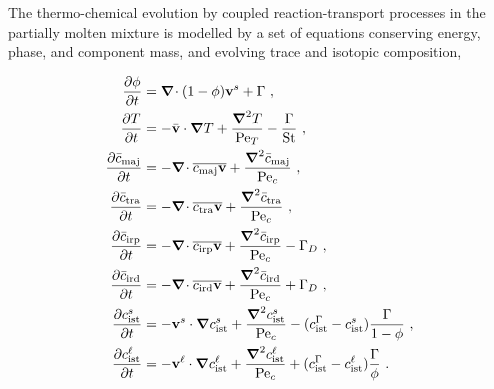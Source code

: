 \documentclass[12pt,a4paper]{article}
\begin{document}
The thermo-chemical evolution by coupled reaction-transport processes in the partially molten mixture is modelled by a set of equations conserving energy, phase, and component mass, and evolving trace and isotopic composition,
\begin{linenomath*}
\begin{subequations}
\label{eq:nondim-coeffs}
\begin{align}
	\label{eq:nondim-phase}
	\dfrac{\partial \phi}{\partial t}  &= \mbox{\boldmath $\nabla$}\!\cdot (1-\phi) \mathbf{v}^s +  \Gamma \ , \\
	\label{eq:nondim-energy}
	\dfrac{\partial T}{\partial t} &= - \bar{\mathbf{v}} \cdot \mbox{\boldmath $\nabla$} T + \dfrac{ \boldsymbol{\nabla}^2 T }{\mathrm{Pe}_T} - \dfrac{\Gamma}{\mathrm{St}} \ , \\
	\label{eq:nondim-major}
	\dfrac{\partial \bar{c}_\mathrm{maj}}{\partial t} &= - \mbox{\boldmath $\nabla$}\!\cdot \overline{c_\mathrm{maj} \mathbf{v}} + \dfrac{ \boldsymbol{\nabla}^2 \bar{c}_\mathrm{maj} }{\mathrm{Pe}_c}  \ , \\
	\label{eq:nondim-trace}
	\dfrac{\partial \bar{c}_\mathrm{tra}}{\partial t} &= - \mbox{\boldmath $\nabla$}\!\cdot  \overline{c_\mathrm{tra} \mathbf{v}} + \dfrac{ \boldsymbol{\nabla}^2 \bar{c}_\mathrm{tra} }{\mathrm{Pe}_c}  \ , \\
	\label{eq:nondim-radiogen-parent}
	\dfrac{\partial \bar{c}_\mathrm{irp}}{\partial t} &= - \mbox{\boldmath $\nabla$}\!\cdot  \overline{c_\mathrm{irp} \mathbf{v}} + \dfrac{ \boldsymbol{\nabla}^2 \bar{c}_\mathrm{irp} }{\mathrm{Pe}_c}  - \Gamma_D  \ , \\
	\label{eq:nondim-radiogen-daughter}
	\dfrac{\partial \bar{c}_\mathrm{ird}}{\partial t} &= - \mbox{\boldmath $\nabla$}\!\cdot  \overline{c_\mathrm{ird} \mathbf{v}} + \dfrac{ \boldsymbol{\nabla}^2 \bar{c}_\mathrm{ird} }{\mathrm{Pe}_c}  + \Gamma_D  \ , \\
	\label{eq:nondim-stable-matrix}
	\dfrac{\partial c_\mathrm{ist}^s}{\partial t} &= - \mathbf{v}^s \cdot \mbox{\boldmath $\nabla$} c_\mathrm{ist}^s + \dfrac{ \boldsymbol{\nabla}^2 c_\mathrm{ist}^s }{\mathrm{Pe}_c}  - (c_\mathrm{ist}^\Gamma - c_\mathrm{ist}^s) \dfrac{\Gamma}{1-\phi}  \ , \\
	\label{eq:nondim-stable-melt}
	\dfrac{\partial c_\mathrm{ist}^\ell}{\partial t} &= - \mathbf{v}^\ell \cdot \mbox{\boldmath $\nabla$} c_\mathrm{ist}^\ell + \dfrac{ \boldsymbol{\nabla}^2 c_\mathrm{ist}^\ell}{\mathrm{Pe}_c} + (c_\mathrm{ist}^\Gamma - c_\mathrm{ist}^\ell) \dfrac{\Gamma}{\phi}  \ .
\end{align}
\end{subequations}
\end{linenomath*}
\end{document}
